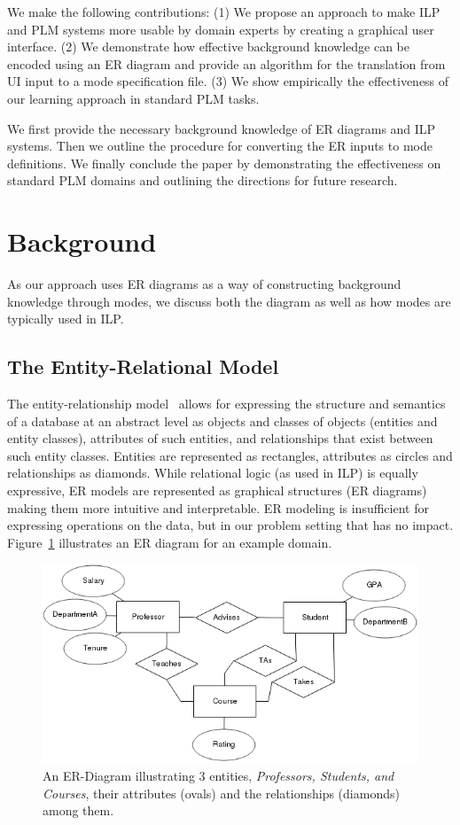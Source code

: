\documentclass[sigconf]{acmart}
\begin{document}
We make the following contributions: (1) We propose an approach to make ILP and PLM systems more usable by domain experts by creating a graphical user interface. (2) We demonstrate how effective background knowledge can be encoded using an ER diagram and provide an algorithm for the  translation from UI input to a mode specification file. (3) We show empirically the effectiveness of our learning approach in standard PLM tasks. 

We first provide the necessary background knowledge of ER diagrams and ILP systems. Then we outline the procedure for converting the ER inputs to mode definitions. We finally conclude the paper by demonstrating the effectiveness on standard PLM domains and outlining the directions for future research.
\section{Background}

As our approach uses ER diagrams as a way of constructing background knowledge through modes, we discuss both the diagram as well as how modes are typically used in ILP. 

\subsection{The Entity-Relational Model}

The entity-relationship model~\cite{chen1976entity} allows for expressing the structure and semantics of a database at an abstract level as objects and classes of objects (entities and entity classes), attributes of such entities, and relationships that exist between such entity classes. Entities are represented as rectangles, attributes as circles and relationships as diamonds. While relational logic (as used in ILP) is equally expressive, ER models are represented as graphical structures (ER diagrams) making them more intuitive and interpretable. ER modeling is insufficient for expressing operations on the data, but in our problem setting that has no impact. Figure~\ref{fig:egERD} illustrates an ER diagram for an example domain.

\begin{figure}
    \centering
    \includegraphics[width=\columnwidth]{images/baseERD.png}
    \caption{An ER-Diagram illustrating 3 entities, \textit{Professors, Students, and Courses}, their attributes (ovals)  and the relationships (diamonds) among them.}
    \label{fig:egERD}
\end{figure}
\end{document}
